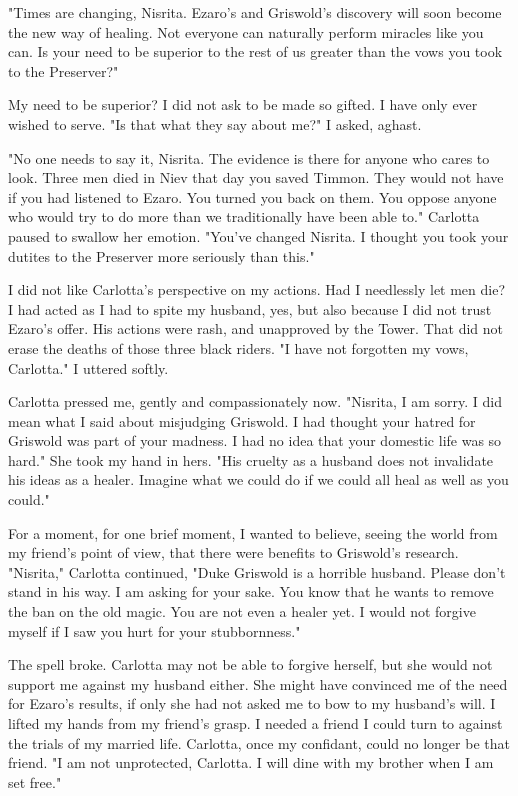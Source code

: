 \documentclass{article}
\begin{document}
"Times are changing, Nisrita. Ezaro's and Griswold's discovery will soon become the new way of healing. Not everyone can naturally perform miracles like you can. Is your need to be superior to the rest of us greater than the vows you took to the Preserver?"

My need to be superior? I did not ask to be made so gifted. I have only ever wished to serve. "Is that what they say about me?" I asked, aghast.

"No one needs to say it, Nisrita. The evidence is there for anyone who cares to look. Three men died in Niev that day you saved Timmon. They would not have if you had listened to Ezaro. You turned you back on them. You oppose anyone who would try to do more than we traditionally have been able to." Carlotta paused to swallow her emotion. "You've changed Nisrita. I thought you took your dutites to the Preserver more seriously than this."

I did not like Carlotta's perspective on my actions. Had I needlessly let men die? I had acted as I had to spite my husband, yes, but also because I did not trust Ezaro's offer. His actions were rash, and unapproved by the Tower. That did not erase the deaths of those three black riders. "I have not forgotten my vows, Carlotta." I uttered softly.

Carlotta pressed me, gently and compassionately now. "Nisrita, I am sorry. I did mean what I said about misjudging Griswold. I had thought your hatred for Griswold was part of your madness. I had no idea that your domestic life was so hard." She took my hand in hers. "His cruelty as a husband does not invalidate his ideas as a healer. Imagine what we could do if we could all heal as well as you could." 

For a moment, for one brief moment, I wanted to believe, seeing the world from my friend's point of view, that there were benefits to Griswold's research. "Nisrita," Carlotta continued, "Duke Griswold is a horrible husband. Please don't stand in his way. I am asking for your sake. You know that he wants to remove the ban on the old magic. You are not even a healer yet. I would not forgive myself if I saw you hurt for your stubbornness."

The spell broke. Carlotta may not be able to forgive herself, but she would not support me against my husband either. She might have convinced me of the need for Ezaro's results, if only she had not asked me to bow to my husband's will. I lifted my hands from my friend's grasp. I needed a friend I could turn to against the trials of my married life. Carlotta, once my confidant, could no longer be that friend. "I am not unprotected, Carlotta. I will dine with my brother when I am set free."
\end{document}
